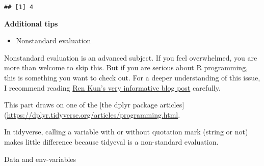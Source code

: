 \documentclass[
]{book}
\newenvironment{Shaded}{\begin{snugshade}}{\end{snugshade}}
\newcommand{\AttributeTok}[1]{\textcolor[rgb]{0.77,0.63,0.00}{#1}}
\newcommand{\CommentTok}[1]{\textcolor[rgb]{0.56,0.35,0.01}{\textit{#1}}}
\newcommand{\DecValTok}[1]{\textcolor[rgb]{0.00,0.00,0.81}{#1}}
\newcommand{\FunctionTok}[1]{\textcolor[rgb]{0.00,0.00,0.00}{#1}}
\newcommand{\NormalTok}[1]{#1}
\newcommand{\OtherTok}[1]{\textcolor[rgb]{0.56,0.35,0.01}{#1}}
\newcommand{\SpecialCharTok}[1]{\textcolor[rgb]{0.00,0.00,0.00}{#1}}
\newcommand{\StringTok}[1]{\textcolor[rgb]{0.31,0.60,0.02}{#1}}
\providecommand{\tightlist}{%
  \setlength{\itemsep}{0pt}\setlength{\parskip}{0pt}}
\begin{document}
\begin{verbatim}
## [1] 4
\end{verbatim}

\textbf{Additional tips}

\begin{itemize}
\tightlist
\item
  Nonstandard evaluation
\end{itemize}

Nonstandard evaluation is an advanced subject. If you feel overwhelmed, you are more than welcome to skip this. But if you are serious about R programming, this is something you want to check out. For a deeper understanding of this issue, I recommend reading \href{https://renkun.me/2014/12/03/tips-on-non-standard-evaluation-in-r/}{Ren Kun's very informative blog post} carefully.

This part draws on one of the {[}the dplyr package articles{]}(\url{https://dplyr.tidyverse.org/articles/programming.html}.

In tidyverse, calling a variable with or without quotation mark (string or not) makes little difference because tidyeval is a non-standard evaluation.

\begin{Shaded}
\end{Shaded}

Data and env-variables

\begin{Shaded}
\end{Shaded}
\end{document}
